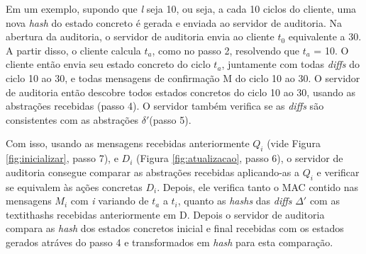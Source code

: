 Em um exemplo, supondo que \textit{l} seja 10, ou seja, a cada 10 ciclos do cliente, uma nova \textit{hash} do estado concreto é gerada e enviada ao servidor de auditoria. Na abertura da auditoria, o servidor de auditoria envia ao cliente $t_0$ equivalente a 30. A partir disso, o cliente calcula $t_a$, como no passo 2, resolvendo que $t_a$ = 10. O cliente então envia seu estado concreto do ciclo $t_a$, juntamente com todas \textit{diffs} do ciclo 10 ao 30, e todas mensagens de confirmação M do ciclo 10 ao 30. O servidor de auditoria então descobre todos estados concretos do ciclo 10 ao 30, usando as abstrações recebidas (passo 4). O servidor também verifica se as \textit{diffs} são consistentes com as abstrações $\delta '$(passo 5).

Com isso, usando as mensagens recebidas anteriormente $Q_i$ (vide Figura \ref{fig:inicializar}, passo 7), e $D_i$ (Figura \ref{fig:atualizacao}, passo 6), o servidor de auditoria consegue comparar as abstrações recebidas aplicando-as a $Q_i$ e verificar se equivalem às ações concretas $D_i$. Depois, ele verifica tanto o MAC contido nas mensagens $M_i$ com \textit{i} variando de $t_a$ a $t_i$, quanto as \textit{hashs} das \textit{diffs} $\Delta '$ com as textit{hashs} recebidas anteriormente em D. Depois o servidor de auditoria compara as \textit{hash} dos estados concretos inicial e final recebidas com os estados gerados atráves do passo 4 e transformados em \textit{hash} para esta comparação.